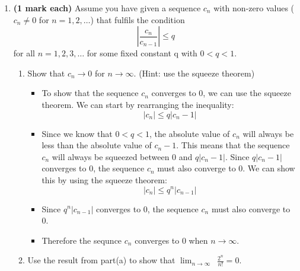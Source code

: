 \documentclass[12pt]{report}
\begin{document}
\begin{enumerate}[leftmargin=\labelsep]
\newpage

    \item {\bf (1 mark each)} Assume you have given a sequence $c_n$ with non-zero values ($c_n\neq0$ for $n=1,2,\dots$) that fulfils the condition
        \begin{equation}
            \left|\frac{c_n}{c_{n-1}}\right|\leq q
        \end{equation} for all $n=1,2,3,\dots$ for some fixed constant q with $0<q<1$.
        \begin{enumerate}
            \item Show that $c_n\to0$ for $n\to \infty$. (Hint: use the squeeze theorem)
                \begin{tcolorbox}
                    \begin{itemize}[label={}]
                        \item To show that the sequence $c_n$ converges to 0, we can use the squeeze theorem. We can start by rearranging the inequality:
                        \begin{equation*}
                            |c_n| \leq q|c_n-1|
                        \end{equation*}
                        \item Since we know that $0<q<1$, the absolute value of $c_n$ will always be less than the absolute value of $c_n-1$. This means that the sequence $c_n$ will always be squeezed between 0 and $q|c_n-1|$. Since $q|c_n-1|$ converges to 0, the sequence $c_n$ must also converge to 0. We can show this by using the squeeze theorem:
                        \begin{equation*}
                            |c_n| \leq q^n|c_{n-1}|
                        \end{equation*}
                        \item Since $q^n|c_{n-1}|$ converges to 0, the sequence $c_n$ must also converge to 0.
                        \item Therefore the sequnce $c_n$ converges to 0 when $n\to \infty$.
                    \end{itemize}
                \end{tcolorbox}
\newpage
            \item Use the result from part(a) to show that $\displaystyle{\lim_{n \to \infty}}\,\,\, \frac{2^n}{n!}=0$.
                \begin{tcolorbox}
                    \begin{itemize}[label={}]

\end{itemize}
\end{tcolorbox}
\end{enumerate}
\end{enumerate}
\end{document}
